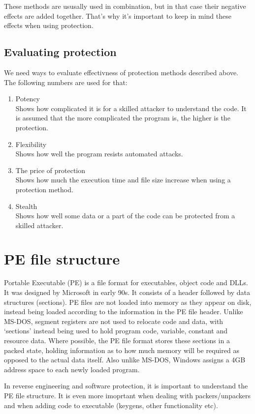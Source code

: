 \documentclass[a4paper,12pt]{article}
\begin{document}
These methods are ususally used in combination, but in that case their
negative effects are added together. That's why it's important to keep in
mind these effects when using protection.

\subsection{Evaluating protection}
We need ways to evaluate effectivness of protection methods described
above. The following numbers are used for that:
\begin{enumerate}
\item Potency\\
    Shows how complicated it is for a skilled attacker to understand the code.
    It is assumed that the more complicated the program is, the higher is the
    protection.
\item Flexibility\\
    Shows how well the program resists automated attacks.
\item The price of protection\\
    Shows how much the execution time and file size increase when using a
    protection method.
\item Stealth\\
    Shows how well some data or a part of the code can be protected from a
    skilled attacker.
\end{enumerate}

\section{PE file structure}
Portable Executable (PE) is a file format for executables, object code and
DLLs. It was designed by Microsoft in early 90s. It consists of a header
followed by data structures (sections). PE files are not loaded into memory as
they appear on disk, instead being loaded according to the information in
the PE file header. Unlike MS-DOS, segment registers are not used to relocate
code and data, with ‘sections’ instead being used to hold program code,
variable, constant and resource data. Where possible, the PE file format
stores these sections in a packed state, holding information as to how much
memory will be required as opposed to the actual data itself. Also unlike
MS-DOS, Windows assigns a 4GB address space to each newly loaded program.

In reverse engineering and software protection, it is important to understand
the PE file structure. It is even more imoprtant when dealing with
packers/unpackers and when adding code to executable (keygens, other
functionality etc).
\end{document}
